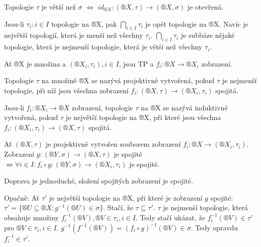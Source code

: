 \documentclass[12pt]{article}					%
\begin{document}
        \begin{poznamka}
            Topologie $\tau$ je větší než $\sigma$ $\Leftrightarrow$ $id_{®X}: (®X, \tau) \rightarrow (®X, \sigma)$ je otevřená.

            Jsou-li $\tau_i: i \in I$ topologie na ®X, pak $\bigcap_{i \in I}\tau_i$ je opět topologie na ®X. Navíc je největší topologií, která je menší než všechny $\tau_i$. $\bigcap_{i \in I} \tau_i$ je subbáze nějaké topologie, která je nejmenší topologie, která je větší než všechny $\tau_i$.
        \end{poznamka}

        \begin{definice}
            Ať ®X je množina a $(®X_i, \tau_i), i \in I$, jsou TP a $f_i: ®X \rightarrow ®X_i$ zobrazení.

            Topologie $\tau$ na množině ®X se nazývá projektivně vytvořená, pokud $\tau$ je nejmenší topologie, při níž jsou všechna zobrazení $f_i: (®X, \tau) \rightarrow (®X_i, \tau_i)$ spojitá.

            Jsou-li $f_i:®X_i \rightarrow ®X$ zobrazení, topologie $\tau$ na ®X se nazývá induktivně vytvořená, pokud $\tau$ je největší topologie na ®X, při které jsou všechna $f_i: (®X_i, \tau_i) \rightarrow (®X, \tau)$ spojitá.
        \end{definice}

        \begin{veta}
            Ať $(®X, \tau)$ je projektivně vytvořen souborem zobrazení $f_i: ®X \rightarrow (®X_i, \tau_i)$. Zobrazení $g: (®Y, \sigma) \rightarrow (®X, \tau)$ je spojité $\Leftrightarrow \forall i \in I: f_i \circ g: (®Y, \sigma) \rightarrow (®X_i, \tau_i)$ je spojité.

            \begin{dukazin}
                Doprava je jednoduché, složení spojitých zobrazení je spojité.

                Opačně: Ať $\tau'$ je největší topologie na ®X, při které je zobrazení $g$ spojité: $\tau' = \{ ®U \subseteq ®X: g^{-1}(®U) \in \sigma\}$. Stačí, že $\tau \subseteq \tau'$. $\tau$ je nejmenší topologie, která obsahuje množiny $f^{-1}_i (®V), ®V \in \tau_i, i \in I$. Tedy stačí ukázat, že $f^{-1}_i (®V) \in \tau'$ pro $®V \in \tau_i, i \in I$. $g^{-1}(f^{-1}(®V)) = (f_i \circ g)^{-1}(®V)\in \sigma$. Tedy opravdu $f_i^{-1} \in \tau'$.
            \end{dukazin}
        \end{veta}
        
\end{document}
